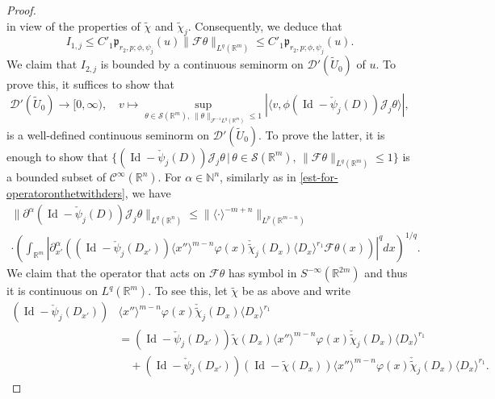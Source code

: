 \documentclass[12pt,reqno]{amsart}
\newcommand{\NN}{\mathbb N}
\newcommand{\RR}{\mathbb R}
\newcommand{\DD}{\mathcal D}
\newcommand{\SSS}{\mathcal S}
\theoremstyle{plain}
\theoremstyle{remark}
\theoremstyle{definition}
\numberwithin{equation}{section}
\begin{document}
\begin{proof}
\begin{equation*}
\end{equation*}
in view of the properties of $\widetilde{\chi}$ and $\widetilde{\chi}_j$. Consequently, we deduce that
\begin{equation*}
I_{1,j}\leq C'_1\mathfrak{p}_{r_2,p;\phi,\psi_j}(u)\|\mathcal{F}\theta\|_{L^q(\RR^m)}\leq C'_1\mathfrak{p}_{r_2,p;\phi,\psi_j}(u).
\end{equation*}
We claim that $I_{2,j}$ is bounded by a continuous seminorm on $\DD'(\widetilde{U}_0)$ of $u$. To prove this, it suffices to show that
\begin{equation*}
\DD'(\widetilde{U}_0)\rightarrow[0,\infty),\quad v\mapsto \sup_{\theta\in\SSS(\RR^m),\, \|\theta\|_{\mathcal{F}^{-1}L^q(\RR^m)}\leq 1} |\langle v, \phi(\operatorname{Id}-\check{\psi}_j(D))\mathcal{J}_j\theta\rangle|,
\end{equation*}
is a well-defined continuous seminorm on $\DD'(\widetilde{U}_0)$. To prove the latter, it is enough to show that $\{(\operatorname{Id}-\check{\psi}_j(D))\mathcal{J}_j\theta\,|\, \theta\in\SSS(\RR^m),\, \|\mathcal{F}\theta\|_{L^q(\RR^m)}\leq 1\}$ is a bounded subset of $\mathcal{C}^{\infty}(\RR^n)$. For $\alpha\in\NN^n$, similarly as in \eqref{est-for-operatoronthetwithders}, we have
\begin{multline*}
\|\partial^{\alpha}(\operatorname{Id}-\check{\psi}_j(D))\mathcal{J}_j\theta\|_{L^q(\RR^n)}\leq\|\langle \cdot\rangle^{-m+n}\|_{L^p(\RR^{m-n})}\\
\cdot\left(\int_{\RR^m}\left|\partial^{\alpha}_{x'}\left((\operatorname{Id}-\check{\psi}_j(D_{x'}))\langle x''\rangle^{m-n}\varphi(x)\check{\widetilde{\chi}}_j(D_x)\langle D_x\rangle^{r_1}\mathcal{F}\theta(x)\right)\right|^qdx\right)^{1/q}.
\end{multline*}
We claim that the operator that acts on $\mathcal{F}\theta$ has symbol in $S^{-\infty}(\RR^{2m})$ and thus it is continuous on $L^q(\RR^m)$. To see this, let $\widetilde{\chi}$ be as above and write
\begin{align*}
(\operatorname{Id}-\check{\psi}_j(D_{x'}))&\langle x''\rangle^{m-n}\varphi(x)\check{\widetilde{\chi}}_j(D_x)\langle D_x\rangle^{r_1}\\
&=(\operatorname{Id}-\check{\psi}_j(D_{x'}))\widetilde{\chi}(D_x)\langle x''\rangle^{m-n}\varphi(x)\check{\widetilde{\chi}}_j(D_x)\langle D_x\rangle^{r_1}\\
&{}\quad +(\operatorname{Id}-\check{\psi}_j(D_{x'}))(\operatorname{Id}-\widetilde{\chi}(D_x))\langle x''\rangle^{m-n}\varphi(x)\check{\widetilde{\chi}}_j(D_x)\langle D_x\rangle^{r_1}.

\end{align*}
\end{proof}
\end{document}
